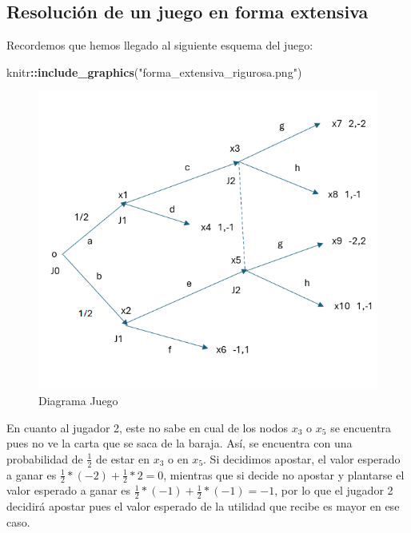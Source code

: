 \documentclass[12pt,a4paper,]{book}
\newenvironment{Shaded}{\begin{snugshade}}{\end{snugshade}}
\newcommand{\FunctionTok}[1]{\textcolor[rgb]{0.13,0.29,0.53}{\textbf{#1}}}
\newcommand{\NormalTok}[1]{#1}
\newcommand{\SpecialCharTok}[1]{\textcolor[rgb]{0.81,0.36,0.00}{\textbf{#1}}}
\newcommand{\StringTok}[1]{\textcolor[rgb]{0.31,0.60,0.02}{#1}}
\numberwithin{dummy}{section}
\theoremstyle{ocrenumbox}
\theoremstyle{blacknumex}
\theoremstyle{blacknumbox}
\theoremstyle{ocrenum}
\theoremstyle{ocrenum}
\begin{document}
\hypertarget{Seccion232}{%
\subsection{Resolución de un juego en forma
extensiva}\label{Seccion232}}

Recordemos que hemos llegado al siguiente esquema del juego:

\begin{Shaded}
\begin{Highlighting}[]
\NormalTok{knitr}\SpecialCharTok{::}\FunctionTok{include\_graphics}\NormalTok{(}\StringTok{"forma\_extensiva\_rigurosa.png"}\NormalTok{)}
\end{Highlighting}
\end{Shaded}

\begin{figure}[H]

{\centering \includegraphics[width=0.8\linewidth]{forma_extensiva_rigurosa} 

}

\caption{\label{forma_extensiva_rigurosa_2}Diagrama Juego}\label{fig:forma_extensiva_rigurosa_2}
\end{figure}

En cuanto al jugador 2, este no sabe en cual de los nodos \(x_3\) o
\(x_5\) se encuentra pues no ve la carta que se saca de la baraja. Así,
se encuentra con una probabilidad de \(\frac{1}{2}\) de estar en \(x_3\)
o en \(x_5\). Si decidimos apostar, el valor esperado a ganar es
\(\frac{1}{2}*(-2) +\frac{1}{2}*2 =0\), mientras que si decide no
apostar y plantarse el valor esperado a ganar es
\(\frac{1}{2}*(-1) +\frac{1}{2}*(-1) =-1\), por lo que el jugador 2
decidirá apostar pues el valor esperado de la utilidad que recibe es
mayor en ese caso.
\end{document}
